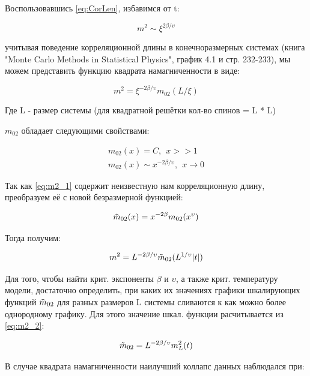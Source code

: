 Воспользовавшись \eqref{eq:CorLen}, избавимся от t:

\begin{equation}
    m^{2} \sim \xi ^{2\beta/\upsilon}
\end{equation}

учитывая поведение корреляционной длины в конечноразмерных системах (книга "Monte Carlo Methods in Statistical Physics", график 4.1 и стр. 232-233)\cite{NewBar}, мы можем представить функцию квадрата намагниченности в виде:

\begin{equation}\label{eq:m2_1}
    m^{2} = \xi ^{-2\beta/\upsilon} m_{02}(L/\xi)
\end{equation}

Где L - размер системы (для квадратной решётки кол-во спинов = L * L)

$m_{02}$ обладает следующими свойствами:

\begin{align*}
    m_{02}(x) = C,\ \ x >> 1 \\
    m_{02}(x) \sim x^{-2\beta/\upsilon},\ \ x \rightarrow 0
\end{align*}

Так как \eqref{eq:m2_1} содержит неизвестную нам корреляционную длину, преобразуем её с новой безразмерной функцией:

\begin{equation}
    \Tilde{m}_{02}(x) = x^{-2\beta} m_{02}(x^{\upsilon})
\end{equation}

Тогда получим:

\begin{equation}\label{eq:m2_2}
    m^{2} = L^{-2\beta/\upsilon} \Tilde{m}_{02}(L^{1/\upsilon}|t|)
\end{equation}

Для того, чтобы найти крит. экспоненты $\beta$ и $\upsilon$, а также крит. температуру модели, достаточно определить, при каких их значениях графики шкалирующих функций $\Tilde{m}_{02}$ для разных размеров L системы сливаются к как можно более однородному графику. Для этого значение шкал. функции расчитывается из \eqref{eq:m2_2}:

\begin{equation}\label{eq:m02}
    \Tilde{m}_{02} = L^{-2\beta/\upsilon} m_{L}^{2}(t)
\end{equation}

В случае квадрата намагниченности наилучший коллапс данных наблюдался при:

